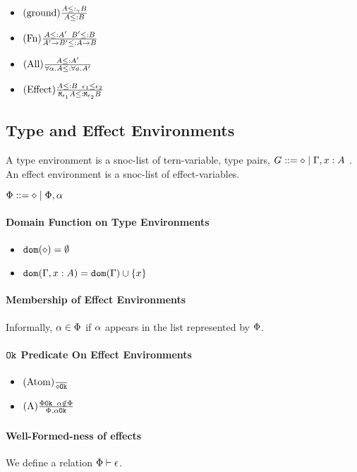 {    \begin{itemize}
        \item $\treerule{ground}{A \subtype_{\ground} B}{A \subtype B}$
        \item $\treerule{Fn}{A \subtype A' \s\s B' \subtype B }{\fntype{A'}{B'} \subtype \ab}$
        \item $\treerule{All}{A\subtype A'}{\all{\a}{A}\subtype\all{a}{A'}}$
        \item $\treerule{Effect}{A\subtype B\s\s \e_1\subeffect\e_2}{\M{\e_1}{A}\subtype\M{\e_2}{B}}$
    \end{itemize}
\subsection{Type and Effect Environments}
A type environment is a snoc-list of tern-variable, type pairs, $G \gens \nil \mid \gax$ .
An effect environment is a snoc-list of effect-variables.

$\P\gens\nil\mid\P, \a$
\paragraph{Domain Function on Type Environments}
\begin{itemize}
    \item $\dom{\nil} = \emptyset$
    \item $\dom{\gax} =  \dom{\G}  \cup \left\{x \right\}$
\end{itemize}

\paragraph{Membership of Effect Environments}
Informally, $\a \in \P$ if $\a$ appears in the list represented by $\P$.

\paragraph{$\ok{}$ Predicate On Effect Environments}
\begin{itemize}
    \item $\treerule{Atom}{}{\ok{\nil}}$
    \item $\treerule{A}{\ok{\P} \s\s \a\notin \P}{\ok{\P, \a}}$
\end{itemize}

\paragraph{Well-Formed-ness of effects}
We define a relation $\wellformed{\P}{\e}$.

}
